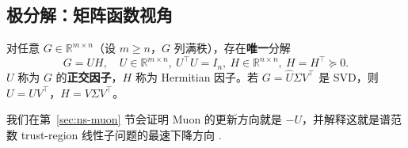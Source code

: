 \subsection{极分解：矩阵函数视角}

\begin{theorem}
\label{thm:polar}
对任意 $G\in\mathbb{R}^{m\times n}$（设 $m\ge n$，$G$ 列满秩），存在\textbf{唯一}分解
\[
  G = U H, \quad U \in \mathbb{R}^{m\times n},\ U^\top U = I_n,\ H \in \mathbb{R}^{n\times n},\ H = H^\top \succeq 0.
\]
$U$ 称为 $G$ 的\textbf{正交因子}，$H$ 称为 Hermitian 因子。若 $G=\widehat U\Sigma V^\top$ 是 SVD，则 $U = \widehat U V^\top$，$H = V \Sigma V^\top$。
\end{theorem}

我们在第~\ref{sec:ns-muon} 节会证明 Muon 的更新方向就是 $-U$，并解释这就是谱范数 trust-region 线性子问题的最速下降方向 \cite{kovalev2025}.
